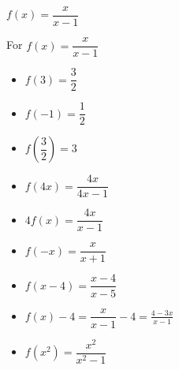{$f(x) = \dfrac{x}{x-1}$}
{For $f(x) = \dfrac{x}{x-1}$ 

\begin{multicols}{2}
\begin{itemize}
\item $f(3) = \dfrac{3}{2}$
\item $f(-1) = \dfrac{1}{2}$
\item $f\left(\dfrac{3}{2} \right) = 3$
\item  $f(4x) = \dfrac{4x}{4x-1}$
\item $4f(x) = \dfrac{4x}{x-1}$
\item $f(-x) = \dfrac{x}{x+1}$
\item  $f(x-4) = \dfrac{x-4}{x-5}$
\item $f(x) - 4 = \dfrac{x}{x-1} - 4 = \frac{4-3x}{x-1}$
\item  $f\left(x^2\right) = \dfrac{x^2}{x^2-1}$
\end{itemize}
\end{multicols}
}
